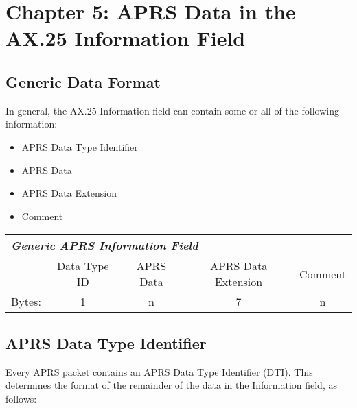 \chapter {Chapter 5: APRS Data in the AX.25 Information Field}

\section {Generic Data Format}

In general, the AX.25 Information field can contain some or all of the
following information:
\begin{itemize}
\item  APRS Data Type Identifier
\item  APRS Data
\item  APRS Data Extension
\item  Comment
\end{itemize}


\begin{tabular}{|l|c|c|c|c|}
  \hline
  \multicolumn{5}{|l|}{\bf\it{Generic APRS Information Field}} \\
  \hline
  & Data Type ID & APRS Data & APRS Data Extension & Comment \\
  \hline 
  Bytes: & 1            & n         & 7                   & n \\
  \hline
\end{tabular}



\section{APRS Data Type Identifier}

Every APRS packet contains an APRS Data Type Identifier (DTI). This
determines the format of the remainder of the data in the Information field, as
follows:


